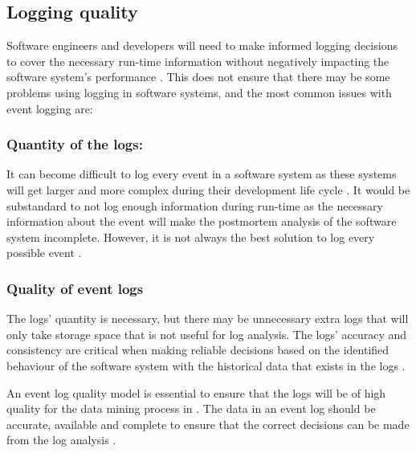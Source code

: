 \clearpage


\subsection{Logging quality}\label{sec:ch1_loggingQuality}

Software engineers and developers will need to make informed logging decisions to cover the necessary run-time information without negatively impacting the software system's performance \cite{Zhu2015, Zhu2019, Kherbouche2017}. This does not ensure that there may be some problems using logging in software systems, and the most common issues with event logging are:

\subsubsection{Quantity of the logs:} 
It can become difficult to log every event in a software system as these systems will get larger and more complex during their development life cycle \cite{Stojanov2017}. It would be substandard to not log enough information during run-time as the necessary information about the event will make the postmortem analysis of the software system incomplete. However, it is not always the best solution to log every possible event \cite{Zhu2015, Jans2012}.

\subsubsection{Quality of event logs} 
The logs' quantity is necessary, but there may be unnecessary extra logs that will only take storage space that is not useful for log analysis. The logs' accuracy and consistency are critical when making reliable decisions based on the identified behaviour of the software system with the historical data that exists in the logs \cite{Stojanov2017, Kherbouche2017}.\par An event log quality model is essential to ensure that the logs will be of high quality for the data mining process in . The data in an event log should be accurate, available and complete to ensure that the correct decisions can be made from the log analysis \cite{Kherbouche2017, VanDerAalst2011}.


